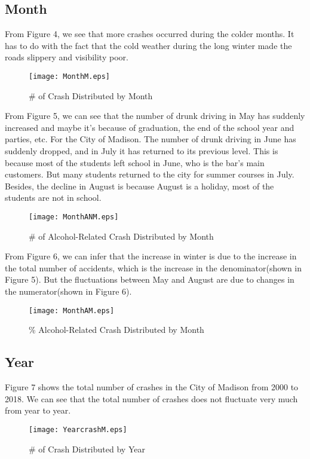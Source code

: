 \documentclass[15pt]{article}
\begin{document}
\subsection{Month}
From Figure 4, we see that more crashes occurred during the colder months. It has to do with the fact that the cold weather during the long winter made the roads slippery and visibility poor.
\begin{figure}[H]
\flushleft
\texttt{[image: MonthM.eps]}
\caption{\# of Crash Distributed by Month}
\end{figure}

\newpage
From Figure 5, we can see that the number of drunk driving in May has suddenly increased and maybe it's because of graduation, the end of the school year and parties, etc. For the City of Madison. The number of drunk driving in June has suddenly dropped, and in July it has returned to its previous level. This is because most of the students left school in June, who is the bar's main customers. But many students returned to the city for summer courses in July. Besides, the decline in August is because August is a holiday, most of the students are not in school.
\begin{figure}[H]
\flushleft
\texttt{[image: MonthANM.eps]}
\caption{\# of Alcohol-Related Crash Distributed by Month}
\end{figure}

\newpage
From Figure 6, we can infer that the increase in winter is due to the increase in the total number of accidents, which is the increase in the denominator(shown in Figure 5). But the fluctuations between May and August are due to changes in the numerator(shown in Figure 6).
\begin{figure}[H]
\flushleft
\texttt{[image: MonthAM.eps]}
\caption{\% Alcohol-Related Crash Distributed by Month}
\end{figure}

\newpage
\subsection{Year}
Figure 7 shows the total number of crashes in the City of Madison from 2000 to 2018. We can see that the total number of crashes does not fluctuate very much from year to year.
\begin{figure}[H]
\flushleft
\texttt{[image: YearcrashM.eps]}
\caption{\# of Crash Distributed by Year}
\end{figure}
\end{document}
